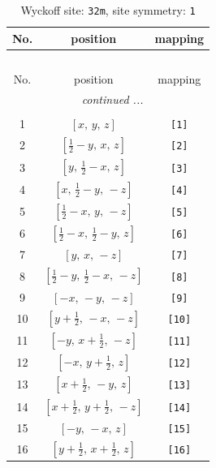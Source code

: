 \documentclass[fleqn,8pt]{jsarticle}
\begin{document}
\renewcommand{\arraystretch}{1.2}
\begin{longtable}{ccc}
\caption{Wyckoff site: {\tt 32m}, site symmetry: {\tt 1}}
 \\
 \hline \hline
No. & position & mapping \\ \hline \endfirsthead

\multicolumn{2}{l}{\tablename\ \thetable{}} \\
 \hline \hline
No. & position & mapping \\ \hline \endhead

 \hline \hline
\multicolumn{2}{r}{\footnotesize\it continued ...} \\ \endfoot

 \hline \hline
\multicolumn{2}{r}{} \\ \endlastfoot

1 & $\left[ x,\, y,\, z \right]$ & {\tt [1]} \\ \hline
2 & $\left[ \frac{1}{2} - y,\, x,\, z \right]$ & {\tt [2]} \\ \hline
3 & $\left[ y,\, \frac{1}{2} - x,\, z \right]$ & {\tt [3]} \\ \hline
4 & $\left[ x,\, \frac{1}{2} - y,\, - z \right]$ & {\tt [4]} \\ \hline
5 & $\left[ \frac{1}{2} - x,\, y,\, - z \right]$ & {\tt [5]} \\ \hline
6 & $\left[ \frac{1}{2} - x,\, \frac{1}{2} - y,\, z \right]$ & {\tt [6]} \\ \hline
7 & $\left[ y,\, x,\, - z \right]$ & {\tt [7]} \\ \hline
8 & $\left[ \frac{1}{2} - y,\, \frac{1}{2} - x,\, - z \right]$ & {\tt [8]} \\ \hline
9 & $\left[ - x,\, - y,\, - z \right]$ & {\tt [9]} \\ \hline
10 & $\left[ y + \frac{1}{2},\, - x,\, - z \right]$ & {\tt [10]} \\ \hline
11 & $\left[ - y,\, x + \frac{1}{2},\, - z \right]$ & {\tt [11]} \\ \hline
12 & $\left[ - x,\, y + \frac{1}{2},\, z \right]$ & {\tt [12]} \\ \hline
13 & $\left[ x + \frac{1}{2},\, - y,\, z \right]$ & {\tt [13]} \\ \hline
14 & $\left[ x + \frac{1}{2},\, y + \frac{1}{2},\, - z \right]$ & {\tt [14]} \\ \hline
15 & $\left[ - y,\, - x,\, z \right]$ & {\tt [15]} \\ \hline
16 & $\left[ y + \frac{1}{2},\, x + \frac{1}{2},\, z \right]$ & {\tt [16]} \\ \hline

\end{longtable}
\end{document}
